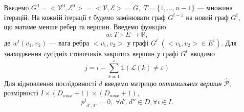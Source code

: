 Введемо $G^0 = <\mathcal{V}^0, \mathcal{E}^0> = <\mathcal{V}, \mathcal{E}> = G,$
$ T = \{1, ..., n-1\} $ --- множина ітерацій. На кожній ітерації $ t $ будемо замінювати граф $ G^{t-1} $ на новий граф $ G^t $, що матиме менше ребер та вершин. Введемо функцію 
$$ w : T \times E \rightarrow \mathbb{R} ,$$
де $ w^t(v_1, v_2) $ --- вага ребра $ <v_1, v_2> $ у графі $ G^t \; (<v_1, v_2> \in E^t )$. Для знаходження cусідніх стовпчиків закритих вершин у графі $ G^t $ вводимо
$$ j = i - \sum\limits_{k = 1}^{i}{ \mathds{1}(\mathcal{L}(k) \neq \varepsilon ) }$$
Для відновлення послідовності $\overline{d}$ введемо матрицю \textit{оптимальних вершин} $\hat{\mathcal{P}}$, розмірності $I \times {(D_{max} + 1)} \times {(D_{max} + 1)}$, 
$${p^i}_{d',d''} = 0, \; \forall d',d'' \in D, \forall i \in I. $$

\newpage

